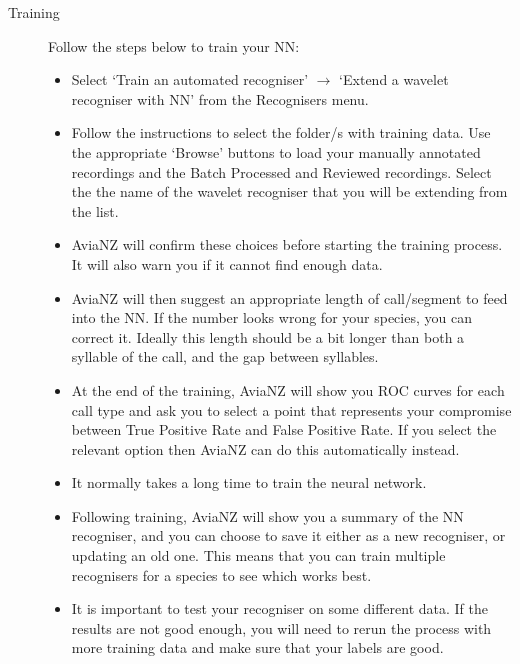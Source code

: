 \documentclass{article}
\begin{document}
\begin{description}
\item[Training] Follow the steps below to train your NN:
\begin{itemize}
\item Select `Train an automated recogniser' $\rightarrow$ `Extend a wavelet recogniser with NN' from the Recognisers menu. 
\item Follow the instructions to select the folder/s with training data. Use the appropriate `Browse' buttons to load your manually annotated recordings and the Batch Processed and Reviewed recordings. Select the the name of the wavelet recogniser that you will be extending from the list. 


\item AviaNZ will confirm these choices before starting the training process. It will also warn you if it cannot find enough data. 
\item AviaNZ will then suggest an appropriate length of call/segment to feed into the NN. If the number looks wrong for your species, you can correct it. Ideally this length should be a bit longer than both a syllable of the call, and the gap between syllables. 
\item At the end of the training, AviaNZ will show you ROC curves for each call type and ask you to select a point that represents your compromise between True Positive Rate and False Positive Rate. If you select the relevant option then AviaNZ can do this automatically instead.


\item It normally takes a long time to train the neural network. 
\item Following training, AviaNZ will show you a summary of the NN recogniser, and you can choose to save it either as a new recogniser, or updating an old one. This means that you can train multiple recognisers for a species to see which works best. 
\item It is important to test your recogniser on some different data. If the results are not good enough, you will need to rerun the process with more training data and make sure that your labels are good.
\end{itemize}
\end{description}
\end{document}

